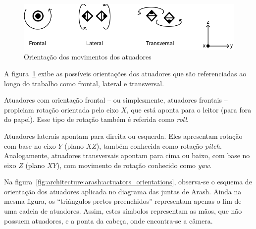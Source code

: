 \begin{figure}[htb]
	\centering
	\includegraphics[scale=1]{imagens/svg/actuators-orientation}
	\caption{Orientação dos movimentos dos atuadores}
	\label{fig:ActuatorsOrientation}
\end{figure}

A figura~\ref{fig:ActuatorsOrientation} exibe as possíveis orientações dos atuadores que são referenciadas ao longo do trabalho como frontal, lateral e transversal.

Atuadores com orientação frontal -- ou simplesmente, atuadores frontais -- propiciam rotação orientada pelo eixo $X$, que está aponta para o leitor (para fora do papel). Esse tipo de rotação também é referida como \textit{roll}.

Atuadores laterais apontam para direita ou esquerda. Eles apresentam rotação com base no eixo $Y$ (plano $XZ$), também conhecida como rotação \textit{pitch}. Analogamente, atuadores transversais apontam para cima ou baixo, com base no eixo $Z$ (plano $XY$), com movimento de rotação conhecido como \textit{yaw}.

Na figura~\ref{fig:architecture:arash:actuators_orientations}, observa-se o esquema de orientação dos atuadores aplicada no diagrama das juntas de Arash. Ainda na mesma figura, os ``triângulos pretos preenchidos'' representam apenas o fim de uma cadeia de atuadores. Assim, estes símbolos representam as mãos, que não possuem atuadores, e a ponta da cabeça, onde encontra-se a câmera. 

